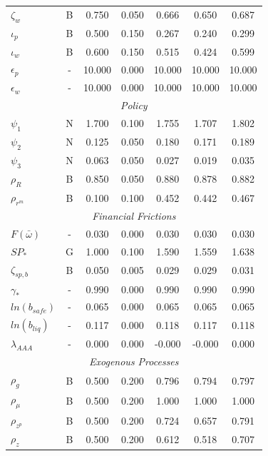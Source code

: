 \documentclass[12pt]{article}
\begin{document}
{\begin{longtable}{lcccccc}
$\zeta_w$ & B &    0.750 &    0.050 &    0.666 &    0.650 &    0.687 \\
$\iota_p$ & B &    0.500 &    0.150 &    0.267 &    0.240 &    0.299 \\
$\iota_w$ & B &    0.600 &    0.150 &    0.515 &    0.424 &    0.599 \\
$\epsilon_{p}$ & - &   10.000 &    0.000 &   10.000 &   10.000 &   10.000 \\
$\epsilon_{w}$ & - &   10.000 &    0.000 &   10.000 &   10.000 &   10.000 \\
\multicolumn{7}{c}{\textit{Policy}} \\[3pt]
$\psi_1$ & N &    1.700 &    0.100 &    1.755 &    1.707 &    1.802 \\
$\psi_2$ & N &    0.125 &    0.050 &    0.180 &    0.171 &    0.189 \\
$\psi_3$ & N &    0.063 &    0.050 &    0.027 &    0.019 &    0.035 \\
$\rho_R$ & B &    0.850 &    0.050 &    0.880 &    0.878 &    0.882 \\
$\rho_{r^m}$ & B &    0.100 &    0.100 &    0.452 &    0.442 &    0.467 \\
\multicolumn{7}{c}{\textit{Financial Frictions}} \\[3pt]
$F(\bar{\omega})$ & - &    0.030 &    0.000 &    0.030 &    0.030 &    0.030 \\
$SP_*$ & G &    1.000 &    0.100 &    1.590 &    1.559 &    1.638 \\
$\zeta_{sp,b}$ & B &    0.050 &    0.005 &    0.029 &    0.029 &    0.031 \\
$\gamma_*$ & - &    0.990 &    0.000 &    0.990 &    0.990 &    0.990 \\
$ln(b_{safe})$ & - &    0.065 &    0.000 &    0.065 &    0.065 &    0.065 \\
$ln(b_{liq})$ & - &    0.117 &    0.000 &    0.118 &    0.117 &    0.118 \\
$\lambda_{AAA}$ & - &    0.000 &    0.000 &   -0.000 &   -0.000 &    0.000 \\
\multicolumn{7}{c}{\textit{Exogenous Processes}} \\[3pt]
$\rho_g$ & B &    0.500 &    0.200 &    0.796 &    0.794 &    0.797 \\
$\rho_{\mu}$ & B &    0.500 &    0.200 &    1.000 &    1.000 &    1.000 \\
$\rho_{z^p}$ & B &    0.500 &    0.200 &    0.724 &    0.657 &    0.791 \\
$\rho_z$ & B &    0.500 &    0.200 &    0.612 &    0.518 &    0.707 \\

\end{longtable}}
\end{document}
